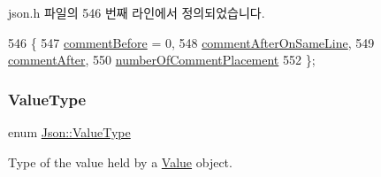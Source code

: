 json.\+h 파일의 546 번째 라인에서 정의되었습니다.


\begin{DoxyCode}
546                       \{
547   \hyperlink{namespace_json_a4fc417c23905b2ae9e2c47d197a45351a52f1733775460517b2ea6bedf4906d52}{commentBefore} = 0,      
548   \hyperlink{namespace_json_a4fc417c23905b2ae9e2c47d197a45351a008a230a0586de54f30b76afe70fdcfa}{commentAfterOnSameLine}, 
549   \hyperlink{namespace_json_a4fc417c23905b2ae9e2c47d197a45351ac5784ca53b12250888ddb642b06aebef}{commentAfter}, 
550   \hyperlink{namespace_json_a4fc417c23905b2ae9e2c47d197a45351abcbd3eb00417335e094e4a03379659b5}{numberOfCommentPlacement}
552 \};
\end{DoxyCode}
\mbox{\label{namespace_json_a7d654b75c16a57007925868e38212b4e}} 
\subsubsection{\texorpdfstring{Value\+Type}{ValueType}}
{\footnotesize\ttfamily enum \hyperlink{namespace_json_a7d654b75c16a57007925868e38212b4e}{Json\+::\+Value\+Type}}



Type of the value held by a \hyperlink{class_json_1_1_value}{Value} object. 

